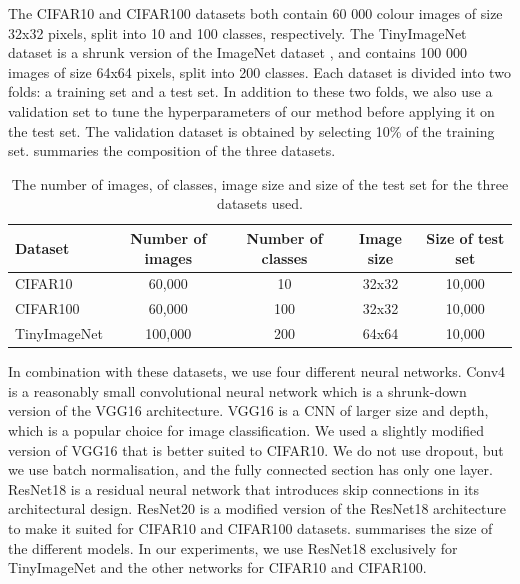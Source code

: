 The CIFAR10 and CIFAR100 datasets both contain 60 000 colour images of size
32x32 pixels, split into 10 and 100 classes, respectively. The TinyImageNet
dataset is a shrunk version of the ImageNet dataset
\cite{DBLP:journals/ijcv/RussakovskyDSKS15}, and contains 100 000 images of size
64x64 pixels, split into 200 classes. Each dataset is divided into two folds: a
training set and a test set. In addition to these two folds, we also use a
validation set to tune the hyperparameters of our method before applying it on
the test set. The validation dataset is obtained by selecting 10\% of the
training set.  summaries the composition of the three
datasets.\\


\begin{table}[ht]
  \centering
  \begin{tabular}{lcccc}
    \toprule
    \textbf{Dataset}    & \textbf{Number of images} & \textbf{Number of classes} &
    \textbf{Image size} & \textbf{Size of test set}                                               \\
    \hline
    CIFAR10             & 60,000                    & 10                         & 32x32 & 10,000 \\
    CIFAR100            & 60,000                    & 100                        & 32x32 & 10,000 \\
    TinyImageNet        & 100,000                   & 200                        & 64x64 & 10,000 \\
    \bottomrule
  \end{tabular}
  \caption{The number of images, of classes, image size and size of the test set for the three datasets used.}
  \label{tab:chap1:datasets}
\end{table}

In combination with these datasets, we use four different neural networks. Conv4
is a reasonably small convolutional neural network which is a
shrunk-down version of the VGG16 architecture. VGG16 is a \acl{CNN}
of larger size and depth, which is a popular choice for image classification. We
used a slightly modified version of VGG16 that is better suited to CIFAR10. We
do not use dropout, but we use batch normalisation, and the fully connected
section has only one layer. ResNet18 is a residual neural network that
introduces skip connections in its architectural design. ResNet20 is a modified
version of the ResNet18 architecture to make it suited for CIFAR10 and CIFAR100
datasets.  summarises the size of the different
models. In our experiments, we use ResNet18 exclusively for TinyImageNet and the
other networks for CIFAR10 and CIFAR100.\\


